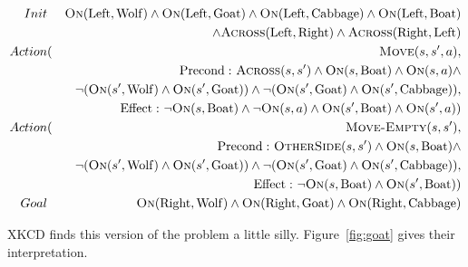 \documentclass[11pt]{article}
\begin{document}
\begin{eqnarray*}
Init & & \mathrm{\textsc{On}}(\mathrm{Left}, \mathrm{Wolf}) \land \mathrm{\textsc{On}}(\mathrm{Left}, \mathrm{Goat}) \land \mathrm{\textsc{On}}(\mathrm{Left}, \mathrm{Cabbage}) \land \mathrm{\textsc{On}}(\mathrm{Left}, \mathrm{Boat}) \\
&& \land \mathrm{\textsc{Across}}(\mathrm{Left}, \mathrm{Right}) \land \mathrm{\textsc{Across}}(\mathrm{Right}, \mathrm{Left})\\
Action&(&\mathrm{\textsc{Move}}(s, s', a),  \\
&&\mathrm{Precond:}\ \mathrm{\textsc{Across}}(s, s') \land \mathrm{\textsc{On}}(s, \mathrm{Boat}) \land \mathrm{\textsc{On}}(s, a) \land \\
&& \lnot(\mathrm{\textsc{On}}(s', \mathrm{Wolf}) \land \mathrm{\textsc{On}}(s', \mathrm{Goat})) \land \lnot (\mathrm{\textsc{On}}(s', \mathrm{Goat}) \land \mathrm{\textsc{On}}(s', \mathrm{Cabbage})), \\
&&\mathrm{Effect:}\ \lnot\mathrm{\textsc{On}}(s,\mathrm{Boat}) \land \lnot \mathrm{\textsc{On}}(s, a) \land \mathrm{\textsc{On}}(s',\mathrm{Boat}) \land \mathrm{\textsc{On}}(s', a)) \\
Action&(&\mathrm{\textsc{Move-Empty}}(s, s'),  \\
&&\mathrm{Precond:}\ \mathrm{\textsc{OtherSide}}(s, s') \land \mathrm{\textsc{On}}(s, \mathrm{Boat}) \land  \\ 
&& \lnot(\mathrm{\textsc{On}}(s', \mathrm{Wolf}) \land \mathrm{\textsc{On}}(s', \mathrm{Goat})) \land \lnot (\mathrm{\textsc{On}}(s', \mathrm{Goat}) \land \mathrm{\textsc{On}}(s', \mathrm{Cabbage})), \\
&&\mathrm{Effect:}\ \lnot \mathrm{\textsc{On}}(s,\mathrm{Boat}) \land \mathrm{\textsc{On}}(s',\mathrm{Boat}) ) \\
Goal & &\mathrm{\textsc{On}}(\mathrm{Right}, \mathrm{Wolf}) \land \mathrm{\textsc{On}}(\mathrm{Right}, \mathrm{Goat}) \land \mathrm{\textsc{On}}(\mathrm{Right}, \mathrm{Cabbage})\\ 
\end{eqnarray*}

XKCD finds this version of the problem a little silly. Figure~\ref{fig:goat} gives their interpretation.
\end{document}

